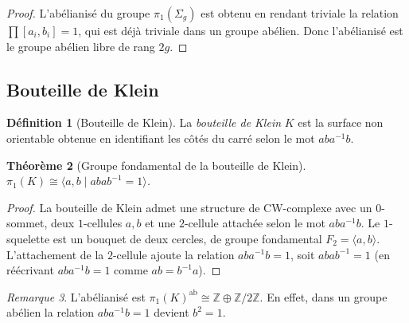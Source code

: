 \documentclass[12pt,a4paper,openany]{book}
\theoremstyle{definition}
\newtheorem{definition}{Définition}[chapter]
\theoremstyle{plain}
\newtheorem{theoreme}[definition]{Théorème}
\theoremstyle{remark}
\newtheorem{remarque}[definition]{Remarque}
\newcommand{\Z}{\mathbb{Z}}
\begin{document}
\begin{proof}
L'abélianisé du groupe $\pi_1(\Sigma_g)$ est obtenu en rendant triviale la relation
$\prod [a_i, b_i] = 1$, qui est déjà triviale dans un groupe abélien. Donc l'abélianisé
est le groupe abélien libre de rang $2g$.
\end{proof}

\subsection{Bouteille de Klein}\label{subsec:klein}

\begin{definition}[Bouteille de Klein]\label{def:bouteille-klein}
La \emph{bouteille de Klein} $K$ est la surface non orientable obtenue en identifiant les
côtés du carré selon le mot $aba^{-1}b$.
\end{definition}

\begin{center}
\end{center}

\begin{theoreme}[{Groupe fondamental de la bouteille de Klein}]\label{thm:pi1-klein}
$\pi_1(K) \cong \langle a, b \mid abab^{-1} = 1 \rangle$.
\end{theoreme}

\begin{proof}
La bouteille de Klein admet une structure de CW-complexe avec un $0$-sommet, deux $1$-cellules
$a, b$ et une $2$-cellule attachée selon le mot $aba^{-1}b$. Le $1$-squelette est un bouquet
de deux cercles, de groupe fondamental $F_2 = \langle a, b \rangle$. L'attachement de la
$2$-cellule ajoute la relation $aba^{-1}b = 1$, soit $abab^{-1} = 1$ (en réécrivant
$aba^{-1}b = 1$ comme $ab = b^{-1}a$).
\end{proof}

\begin{remarque}\label{rem:klein-abelianise}
L'abélianisé est $\pi_1(K)^{\mathrm{ab}} \cong \Z \oplus \Z/2\Z$.
En effet, dans un groupe abélien la relation $aba^{-1}b = 1$ devient $b^2 = 1$.
\end{remarque}
\end{document}
